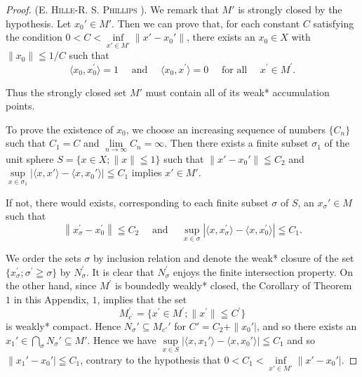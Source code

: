 \begin{proof}
 (E. \textsc{Hille}-R. S. \textsc{Phillips} \cite{hille97}). We remark that $M'$ is strongly closed by the hypothesis. Let $x_0' \in M'$. Then we can prove that, for each constant $C$ satisfying the condition $0 < C < \inf\limits_{x' \in M'} \|x' - x_0'\|$, there exists an $x_0 \in X$ with $\|x_0\| \leqq 1 / C$ such that 
\begin{equation}\label{eq:AV.4.1}
\langle x _{0}, x _{0} ^{\prime} \rangle = 1 \quad \text{ and } \quad \langle x _{0}, x ^{\prime} \rangle = 0 \quad \text{ for all } \quad x ^{\prime} \in M ^{\prime}. \end{equation}

Thus the strongly closed set $M'$ must contain all of its weak* accumulation points. 


To prove the existence of $x_0$, we choose an increasing sequence of numbers $\{C_n\}$ such that $C_1 = C$ and $\lim\limits_{n \to \infty} C_n = \infty$. Then there exists a finite subset $\sigma_1$ of the unit sphere $S = \{x \in X; \|x\| \leqq 1\}$ such that $\|x' - x_0'\| \leqq C_2$ and $\sup\limits_{x \in \sigma_1} |\langle x, x' \rangle - \langle x, x_0' \rangle| \leqq C_1$ implies $x' \in M'$. 

If not, there would exists, corresponding to each finite subset $\sigma$ of $S$, an $x_{\sigma}' \in M$ such that 
\[
\left\| x _{\sigma} ^{\prime} - x _{0} ^{\prime} \right\| \leqq C _{2} \quad \text{ and } \quad \sup\limits _{x \in \sigma} | \langle x, x _{\sigma} ^{\prime} \rangle - \langle x, x _{0} ^{\prime} \rangle | \leqq C _{1}.
\]

We order the sets $\sigma$ by inclusion relation and denote the weak* closure of the set $\{x_{\sigma}^{\prime};\sigma^{\prime}\geqq \sigma \}$ by $N_{\sigma}^{\prime}$. It is clear that $N_{\sigma}^{\prime}$ enjoys the finite intersection property. On the other hand, since $M^{\prime}$ is boundedly weakly* closed, the Corollary of Theorem~\hyperref[thm:AV.1.Theorem.1]{$1$} in this Appendix, $1$, implies that the set 
\[
M _ {c ^{\prime}} ^{\prime} = \{x ^{\prime} \in M ^{\prime}; \| x ^{\prime} \| \leqq C ^{\prime} \}
\]
is weakly* compact. Hence $N_{\sigma}' \subseteq M_{c'}'$ for $C' = C_2 + \|x_0'|$, and so there exists an $x_1' \in \bigcap\limits_{\sigma} N_{\sigma}' \subseteq M'$. Hence we have $\sup\limits_{x \in S} |\langle x, x_1' \rangle - \langle x, x_0' \rangle| \leqq C_1$ and so $\|x_1' - x_0'| \leqq C_1$, contrary to the hypothesis that $0 < C_1 < \inf\limits_{x' \in M'} \|x' - x_0'|$. 


\end{proof}
